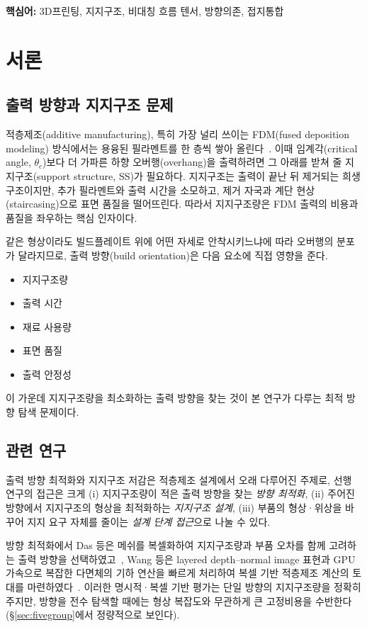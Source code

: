 \documentclass[11pt,a4paper]{article}
\begin{document}
\noindent\textbf{핵심어:} 3D프린팅, 지지구조, 비대칭 흐름 텐서, 방향의존, 접지통합

\section{서론}

\subsection{출력 방향과 지지구조 문제}

적층제조(additive manufacturing), 특히 가장 널리 쓰이는 FDM(fused deposition modeling) 방식에서는
용융된 필라멘트를 한 층씩 쌓아 올린다~\cite{gibson}.
이때 임계각(critical angle, $\theta_c$)보다 더 가파른 하향 오버행(overhang)을 출력하려면
그 아래를 받쳐 줄 지지구조(support structure, SS)가 필요하다.
지지구조는 출력이 끝난 뒤 제거되는 희생 구조이지만, 추가 필라멘트와 출력 시간을 소모하고,
제거 자국과 계단 현상(staircasing)으로 표면 품질을 떨어뜨린다.
따라서 지지구조량은 FDM 출력의 비용과 품질을 좌우하는 핵심 인자이다.

같은 형상이라도 빌드플레이트 위에 어떤 자세로 안착시키느냐에 따라 오버행의 분포가 달라지므로,
출력 방향(build orientation)은 다음 요소에 직접 영향을 준다.

\begin{itemize}
\item 지지구조량
\item 출력 시간
\item 재료 사용량
\item 표면 품질
\item 출력 안정성
\end{itemize}

이 가운데 지지구조량을 최소화하는 출력 방향을 찾는 것이 본 연구가 다루는 최적 방향 탐색 문제이다.

\subsection{관련 연구}
\label{sec:related}

출력 방향 최적화와 지지구조 저감은 적층제조 설계에서 오래 다루어진 주제로,
선행 연구의 접근은 크게 (i) 지지구조량이 적은 출력 방향을 찾는 \emph{방향 최적화},
(ii) 주어진 방향에서 지지구조의 형상을 최적화하는 \emph{지지구조 설계},
(iii) 부품의 형상·위상을 바꾸어 지지 요구 자체를 줄이는 \emph{설계 단계 접근}으로 나눌 수 있다.

방향 최적화에서 Das 등은 메쉬를 복셀화하여 지지구조량과 부품 오차를 함께 고려하는
출력 방향을 선택하였고~\cite{das2017}, Wang 등은 layered depth--normal image 표현과 GPU 가속으로
복잡한 다면체의 기하 연산을 빠르게 처리하여 복셀 기반 적층제조 계산의 토대를 마련하였다~\cite{wang2010}.
이러한 명시적·복셀 기반 평가는 단일 방향의 지지구조량을 정확히 주지만,
방향을 전수 탐색할 때에는 형상 복잡도와 무관하게 큰 고정비용을 수반한다
(\S\ref{sec:fivegroup}에서 정량적으로 보인다).
\end{document}
